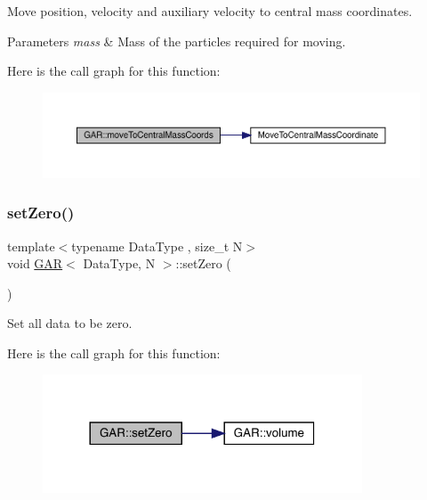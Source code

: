 Move position, velocity and auxiliary velocity to central mass coordinates. 
\begin{DoxyParams}{Parameters}
{\em mass} & Mass of the particles required for moving. \\
\hline
\end{DoxyParams}
Here is the call graph for this function\+:\nopagebreak
\begin{figure}[H]
\begin{center}
\leavevmode
\includegraphics[width=350pt]{class_g_a_r_a373d938047a04b051683ee93198b1832_cgraph}
\end{center}
\end{figure}
\mbox{\label{class_g_a_r_a3c59ee9bf8aae928644fa2beabbffa7c}} 
\subsubsection{\texorpdfstring{set\+Zero()}{setZero()}}
{\footnotesize\ttfamily template$<$typename Data\+Type , size\+\_\+t N$>$ \\
void \mbox{\hyperlink{class_g_a_r}{G\+AR}}$<$ Data\+Type, N $>$\+::set\+Zero (\begin{DoxyParamCaption}{ }\end{DoxyParamCaption})\hspace{0.3cm}{\ttfamily [inline]}}



Set all data to be zero. 

Here is the call graph for this function\+:\nopagebreak
\begin{figure}[H]
\begin{center}
\leavevmode
\includegraphics[width=269pt]{class_g_a_r_a3c59ee9bf8aae928644fa2beabbffa7c_cgraph}
\end{center}
\end{figure}
\mbox{\label{class_g_a_r_a850c24cdfd1656389e3e42f575035edb}} 
